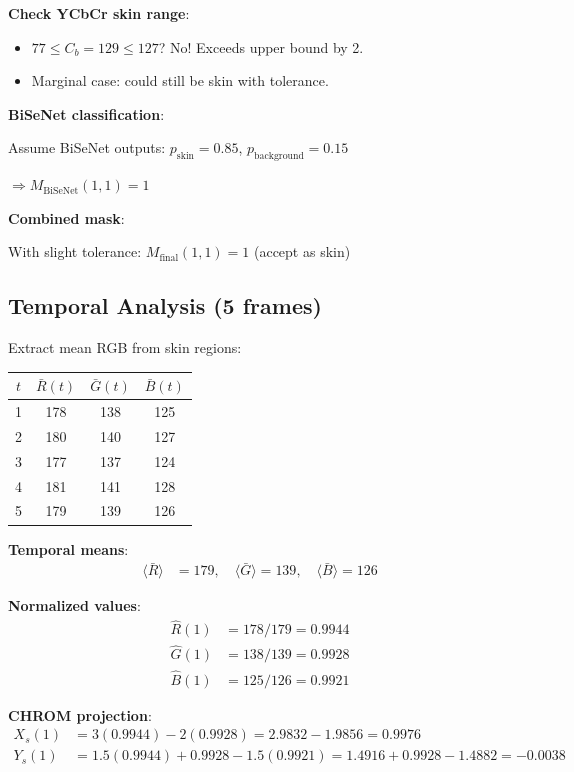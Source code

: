 \documentclass[11pt,a4paper]{article}
\begin{document}
\textbf{Check YCbCr skin range}:
\begin{itemize}
    \item $77 \leq C_b = 129 \leq 127$? No! Exceeds upper bound by 2.
    \item Marginal case: could still be skin with tolerance.
\end{itemize}

\textbf{BiSeNet classification}:

Assume BiSeNet outputs: $p_{\text{skin}} = 0.85$, $p_{\text{background}} = 0.15$

$\Rightarrow M_{\text{BiSeNet}}(1,1) = 1$

\textbf{Combined mask}:

With slight tolerance: $M_{\text{final}}(1,1) = 1$ (accept as skin)

\subsection{Temporal Analysis (5 frames)}

Extract mean RGB from skin regions:

\begin{center}
\begin{tabular}{c|ccc}
$t$ & $\bar{R}(t)$ & $\bar{G}(t)$ & $\bar{B}(t)$ \\
\hline
1 & 178 & 138 & 125 \\
2 & 180 & 140 & 127 \\
3 & 177 & 137 & 124 \\
4 & 181 & 141 & 128 \\
5 & 179 & 139 & 126
\end{tabular}
\end{center}

\textbf{Temporal means}:
\begin{align*}
\langle \bar{R} \rangle &= 179, \quad \langle \bar{G} \rangle = 139, \quad \langle \bar{B} \rangle = 126
\end{align*}

\textbf{Normalized values}:
\begin{align*}
\hat{R}(1) &= 178/179 = 0.9944 \\
\hat{G}(1) &= 138/139 = 0.9928 \\
\hat{B}(1) &= 125/126 = 0.9921
\end{align*}

\textbf{CHROM projection}:
\begin{align*}
X_s(1) &= 3(0.9944) - 2(0.9928) = 2.9832 - 1.9856 = 0.9976 \\
Y_s(1) &= 1.5(0.9944) + 0.9928 - 1.5(0.9921) = 1.4916 + 0.9928 - 1.4882 = -0.0038
\end{align*}
\end{document}
